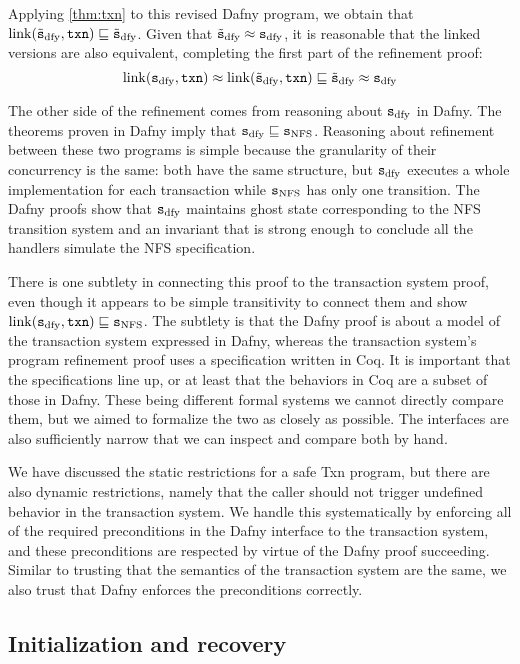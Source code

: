 Applying \cref{thm:txn} to this revised Dafny program, we obtain that
$\mathrm{link}(\tilde{\texttt{s}}_{\mathrm{dfy}}, \texttt{txn}) \sqsubseteq \tilde{\texttt{s}}_{\mathrm{dfy}}$. Given that $\tilde{\texttt{s}}_{\mathrm{dfy}} \approx \texttt{s}_{\mathrm{dfy}}$, it is
reasonable that the linked versions are also equivalent, completing the first
part of the refinement proof:
\[
  \mathrm{link}(\texttt{s}_{\mathrm{dfy}}, \texttt{txn}) \approx \mathrm{link}(\tilde{\texttt{s}}_{\mathrm{dfy}}, \texttt{txn}) \sqsubseteq \tilde{\texttt{s}}_{\mathrm{dfy}} \approx \texttt{s}_{\mathrm{dfy}}
\]

The other side of the refinement comes from reasoning about $\texttt{s}_{\mathrm{dfy}}$ in Dafny.
The theorems proven in Dafny imply that $\texttt{s}_{\mathrm{dfy}} \sqsubseteq \texttt{s}_{\mathrm{NFS}}$. Reasoning about
refinement between these two programs is simple because the granularity of their
concurrency is the same: both have the same structure, but $\texttt{s}_{\mathrm{dfy}}$ executes a
whole implementation for each transaction while $\texttt{s}_{\mathrm{NFS}}$ has only one transition.
The Dafny proofs show that $\texttt{s}_{\mathrm{dfy}}$ maintains ghost state corresponding to the
NFS transition system and an invariant that is strong enough to conclude all the
handlers simulate the NFS specification.

There is one subtlety in connecting this proof to the transaction system proof,
even though it appears to be simple transitivity to connect them and show
$\mathrm{link}(\texttt{s}_{\mathrm{dfy}}, \texttt{txn}) \sqsubseteq \texttt{s}_{\mathrm{NFS}}$. The subtlety is that the Dafny proof is about a
model of the transaction system expressed in Dafny, whereas the transaction
system's program refinement proof uses a specification written in Coq. It is
important that the specifications line up, or at least that the behaviors in Coq
are a subset of those in Dafny. These being different formal systems we cannot
directly compare them, but we aimed to formalize the two as closely as possible.
The interfaces are also sufficiently narrow that we can inspect and compare both
by hand.

We have discussed the static restrictions for a safe Txn program, but there are
also dynamic restrictions, namely that the caller should not trigger undefined
behavior in the transaction system. We handle this systematically by enforcing
all of the required preconditions in the Dafny interface to the transaction
system, and these preconditions are respected by virtue of the Dafny proof
succeeding. Similar to trusting that the semantics of the transaction system are
the same, we also trust that Dafny enforces the preconditions correctly.

\subsection{Initialization and recovery}

